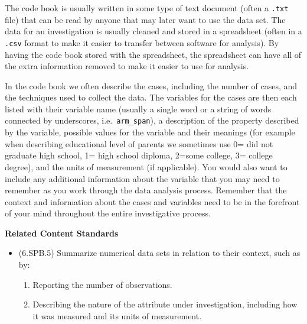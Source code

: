 \documentclass[
]{book}
\providecommand{\tightlist}{%
  \setlength{\itemsep}{0pt}\setlength{\parskip}{0pt}}
\newenvironment{standards}{}{}
\theoremstyle{definition}
\theoremstyle{definition}
\theoremstyle{definition}
\theoremstyle{definition}
\theoremstyle{remark}
\begin{document}
The code book is usually written in some type of text document (often a \texttt{.txt} file) that can be read by anyone that may later want to use the data set. The data for an investigation is usually cleaned and stored in a spreadsheet (often in a \texttt{.csv} format to make it easier to transfer between software for analysis). By having the code book stored with the spreadsheet, the spreadsheet can have all of the extra information removed to make it easier to use for analysis.

In the code book we often describe the cases, including the number of cases, and the techniques used to collect the data. The variables for the cases are then each listed with their variable name (usually a single word or a string of words connected by underscores, i.e.~\texttt{arm\_span}), a description of the property described by the variable, possible values for the variable and their meanings (for example when describing educational level of parents we sometimes use 0= did not graduate high school, 1= high school diploma, 2=some college, 3= college degree), and the units of measurement (if applicable). You would also want to include any additional information about the variable that you may need to remember as you work through the data analysis process. Remember that the context and information about the cases and variables need to be in the forefront of your mind throughout the entire investigative process.

\begin{standards}

\begin{center}
\textbf{Related Content Standards}

\end{center}

\begin{itemize}
\item
  (6.SPB.5) Summarize numerical data sets in relation to their context, such as by:

  \begin{enumerate}
  \def\labelenumi{\alph{enumi}.}
  \tightlist
  \item
    Reporting the number of observations.
  \item
    Describing the nature of the attribute under investigation, including how it was measured and its units of measurement.
  \end{enumerate}
\end{itemize}

\end{standards}
\end{document}
